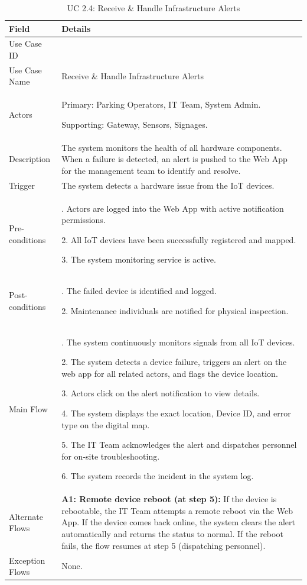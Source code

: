 \begin{table}[H]
\small
\renewcommand{\arraystretch}{1.4}
\begin{tabularx}{\textwidth}{|>{\raggedright\arraybackslash}p{3.5cm}|>{\RaggedRight\arraybackslash}X|}
\hline
\rowcolor{gray!20} \textbf{Field} & \textbf{Details} \\
\hline
Use Case ID & 2.4 \\
\hline
Use Case Name & Receive \& Handle Infrastructure Alerts \\
\hline
Actors & Primary: Parking Operators, IT Team, System Admin. \par Supporting: Gateway, Sensors, Signages. \\
\hline
Description & The system monitors the health of all hardware components. When a failure is detected, an alert is pushed to the Web App for the management team to identify and resolve. \\
\hline
Trigger & The system detects a hardware issue from the IoT devices. \\
\hline
Pre-conditions & 1. Actors are logged into the Web App with active notification permissions. \par 2. All IoT devices have been successfully registered and mapped. \par 3. The system monitoring service is active. \\
\hline
Post-conditions & 1. The failed device is identified and logged. \par 2. Maintenance individuals are notified for physical inspection. \\
\hline
Main Flow & 
1. The system continuously monitors signals from all IoT devices. \par
2. The system detects a device failure, triggers an alert on the web app for all related actors, and flags the device location. \par
3. Actors click on the alert notification to view details. \par
4. The system displays the exact location, Device ID, and error type on the digital map. \par
5. The IT Team acknowledges the alert and dispatches personnel for on-site troubleshooting. \par
6. The system records the incident in the system log. \\
\hline
Alternate Flows & 
\textbf{A1: Remote device reboot (at step 5):} If the device is rebootable, the IT Team attempts a remote reboot via the Web App. If the device comes back online, the system clears the alert automatically and returns the status to normal. If the reboot fails, the flow resumes at step 5 (dispatching personnel). \\
\hline
Exception Flows & 
None. \\
\hline
\end{tabularx}
\caption{UC 2.4: Receive \& Handle Infrastructure Alerts}
\label{tab:uc2.4}
\end{table}